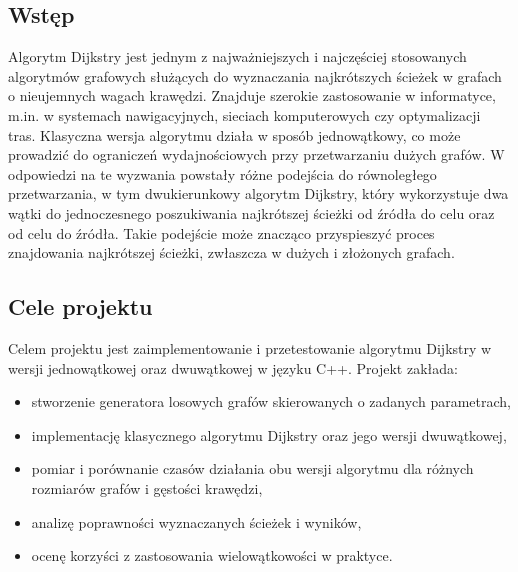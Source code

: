 \documentclass[a4paper,12pt]{article}
\begin{document}
        \subsection{Wstęp}
            \vspace{1em}
            Algorytm Dijkstry jest jednym z najważniejszych i najczęściej stosowanych algorytmów grafowych służących do wyznaczania najkrótszych ścieżek w grafach o nieujemnych wagach krawędzi. Znajduje szerokie zastosowanie w informatyce, m.in. w systemach nawigacyjnych, sieciach komputerowych czy optymalizacji tras. Klasyczna wersja algorytmu działa w sposób jednowątkowy, co może prowadzić do ograniczeń wydajnościowych przy przetwarzaniu dużych grafów. W odpowiedzi na te wyzwania powstały różne podejścia do równoległego przetwarzania, w tym dwukierunkowy algorytm Dijkstry, który wykorzystuje dwa wątki do jednoczesnego poszukiwania najkrótszej ścieżki od źródła do celu oraz od celu do źródła. Takie podejście może znacząco przyspieszyć proces znajdowania najkrótszej ścieżki, zwłaszcza w dużych i złożonych grafach.
            \vspace{2em}
        \subsection{Cele projektu}
            \vspace{1em}
            Celem projektu jest zaimplementowanie i przetestowanie algorytmu Dijkstry w wersji jednowątkowej oraz dwuwątkowej w języku C++. Projekt zakłada:
            \begin{itemize}
                \item stworzenie generatora losowych grafów skierowanych o zadanych parametrach,
                \item implementację klasycznego algorytmu Dijkstry oraz jego wersji dwuwątkowej,
                \item pomiar i porównanie czasów działania obu wersji algorytmu dla różnych rozmiarów grafów i gęstości krawędzi,
                \item analizę poprawności wyznaczanych ścieżek i wyników,
                \item ocenę korzyści z zastosowania wielowątkowości w praktyce.
            \end{itemize}
        \newpage
        \vspace*{2em}
\end{document}
